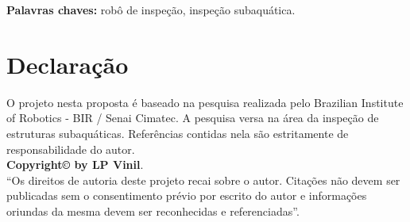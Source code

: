\vspace*{1cm}
\noindent \textbf{Palavras chaves: }robô de inspeção, inspeção subaquática.


\chapter*{Declaração}
O projeto nesta proposta é baseado na pesquisa realizada pelo Brazilian Institute of Robotics - BIR / Senai Cimatec. A pesquisa versa na área da inspeção de estruturas subaquáticas. Referências contidas nela são estritamente de responsabilidade do autor.\\
\vspace*{8cm}
\vfill
\noindent \textbf{Copyright\copyright{} by LP Vinil}.\\
``Os direitos de autoria deste projeto recai sobre o autor. Citações não devem ser publicadas sem o consentimento prévio por escrito do autor e informações oriundas da mesma devem ser reconhecidas e referenciadas''.




